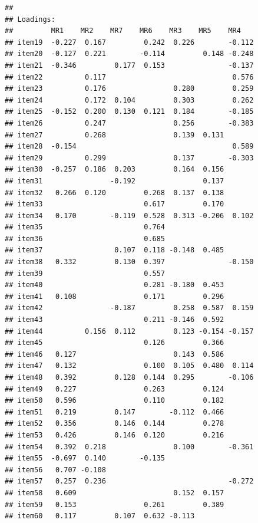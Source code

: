 \documentclass[
  english,
  man]{apa6}
\begin{document}
\begin{verbatim}
## 
## Loadings:
##         MR1    MR2    MR7    MR6    MR3    MR5    MR4   
## item19  -0.227  0.167         0.242  0.226        -0.112
## item20  -0.127  0.221        -0.114         0.148 -0.248
## item21  -0.346         0.177  0.153               -0.137
## item22          0.117                              0.576
## item23          0.176                0.280         0.259
## item24          0.172  0.104         0.303         0.262
## item25  -0.152  0.200  0.130  0.121  0.184        -0.185
## item26          0.247                0.256        -0.383
## item27          0.268                0.139  0.131       
## item28  -0.154                                     0.589
## item29          0.299                0.137        -0.303
## item30  -0.257  0.186  0.203         0.164  0.156       
## item31                -0.192                0.137       
## item32   0.266  0.120         0.268  0.137  0.138       
## item33                        0.617         0.170       
## item34   0.170        -0.119  0.528  0.313 -0.206  0.102
## item35                        0.764                     
## item36                        0.685                     
## item37                 0.107  0.118 -0.148  0.485       
## item38   0.332         0.130  0.397               -0.150
## item39                        0.557                     
## item40                        0.281 -0.180  0.453       
## item41   0.108                0.171         0.296       
## item42                -0.187         0.258  0.587  0.159
## item43                        0.211 -0.146  0.592       
## item44          0.156  0.112         0.123 -0.154 -0.157
## item45                        0.126         0.366       
## item46   0.127                       0.143  0.586       
## item47   0.132                0.100  0.105  0.480  0.114
## item48   0.392         0.128  0.144  0.295        -0.106
## item49   0.227                0.263         0.124       
## item50   0.596                0.110         0.182       
## item51   0.219         0.147        -0.112  0.466       
## item52   0.356         0.146  0.144         0.278       
## item53   0.426         0.146  0.120         0.216       
## item54   0.392  0.218                0.100        -0.361
## item55  -0.697  0.140        -0.135                     
## item56   0.707 -0.108                                   
## item57   0.257  0.236                             -0.272
## item58   0.609                       0.152  0.157       
## item59   0.153                0.261         0.389       
## item60   0.117         0.107  0.632 -0.113              

\end{verbatim}
\end{document}
